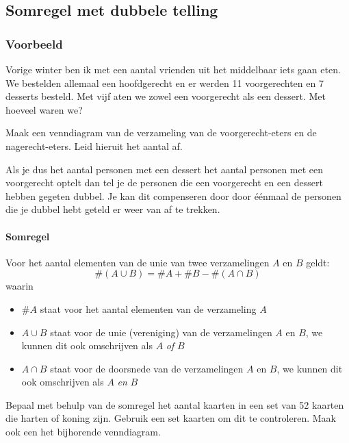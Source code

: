 \documentclass[12pt,twoside]{article}
\begin{document}
\begin{cursus}

\subsection{Somregel met dubbele telling}

\subsubsection*{Voorbeeld}

Vorige winter ben ik met een aantal vrienden uit het middelbaar iets gaan eten. We bestelden allemaal een hoofdgerecht en er werden 11 voorgerechten en 7 desserts besteld. Met vijf aten we zowel een voorgerecht als een dessert. Met hoeveel waren we?

Maak een venndiagram van de verzameling van de voorgerecht-eters en de nagerecht-eters. Leid hieruit het aantal af.
\vspace*{4cm}

Als je dus het aantal personen met een dessert het aantal personen met een voorgerecht optelt dan tel je de personen die een voorgerecht en een dessert hebben gegeten dubbel. Je kan dit compenseren door door éénmaal de personen die je dubbel hebt geteld er weer van af te trekken.

\paragraph*{Somregel}
\begin{mdframed}
Voor het aantal elementen van de unie van twee verzamelingen $A$ en $B$ geldt:
$$\#(A\cup B) = \#A + \#B - \#(A\cap B)$$
waarin
\begin{itemize}
  \item $\#A$ staat voor het aantal elementen van de verzameling $A$
  \item $A\cup B$ staat voor de unie (vereniging) van de verzamelingen $A$ en $B$, we kunnen dit ook omschrijven als $A$ {\em of} $B$
  \item $A\cap B$ staat voor de doorsnede van de verzamelingen $A$ en $B$, we kunnen dit ook omschrijven als $A$ {\em en} $B$
\end{itemize}
\end{mdframed}

\end{cursus}

\begin{oefening}
Bepaal met behulp van de somregel het aantal kaarten in een set van 52 kaarten die harten of koning zijn. Gebruik een set kaarten om dit te controleren. Maak ook een het bijhorende venndiagram.
\end{oefening}
\end{document}
